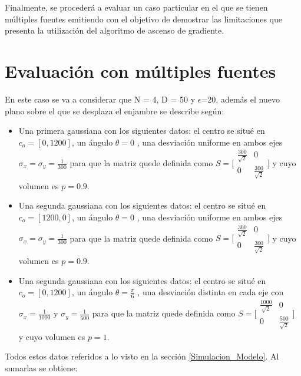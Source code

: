 Finalmente, se procederá a evaluar un caso particular en el que se tienen múltiples fuentes emitiendo con el objetivo de demostrar las limitaciones que presenta la utilización del algoritmo de ascenso de gradiente.

\section{Evaluación con múltiples fuentes}

En este caso se va a considerar que N = 4, D = 50 y $\epsilon$=20, además el nuevo plano sobre el que se desplaza el enjambre se describe según:

\begin{itemize}
	\item Una primera gaussiana con los siguientes datos: el centro se situé en $c_{o}=[0,1200]$, un ángulo $\theta=0$ , una desviación uniforme en ambos ejes $\sigma_{x}=\sigma_{y}=\frac{1}{300}$ para que la matriz quede definida como $S = \bigl[\begin{smallmatrix}\frac{300}{\sqrt{2}} & 0\\ 0 & \frac{300}{\sqrt{2}}\end{smallmatrix}\bigr]$  y cuyo volumen es $p = 0.9$. 
	\item Una segunda gaussiana con los siguientes datos: el centro se situé en $c_{o}=[1200,0]$, un ángulo $\theta=0$ , una desviación uniforme en ambos ejes $\sigma_{x}=\sigma_{y}=\frac{1}{300}$ para que la matriz quede definida como $S = \bigl[\begin{smallmatrix}\frac{300}{\sqrt{2}} & 0\\ 0 & \frac{300}{\sqrt{2}}\end{smallmatrix}\bigr]$  y cuyo volumen es $p = 0.9$.
	\item Una segunda gaussiana con los siguientes datos: el centro se situé en $c_{o}=[0,1200]$, un ángulo $\theta=\frac{\pi}{6}$ , una desviación distinta en cada eje con $\sigma_{x}=\frac{1}{1000}$ y $\sigma_{y}=\frac{1}{500}$  para que la matriz quede definida como $S = \bigl[\begin{smallmatrix}\frac{1000}{\sqrt{2}} & 0\\ 0 & \frac{500}{\sqrt{2}}\end{smallmatrix}\bigr]$ y cuyo volumen es $p = 1$. 
\end{itemize}

Todos estos datos referidos a lo visto en la sección \ref{Simulacion_Modelo}. Al sumarlas se obtiene:

